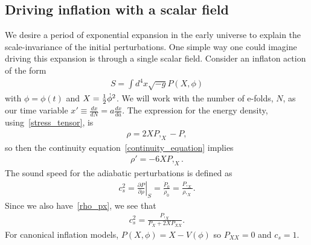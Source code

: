     \subsection{Driving inflation with a scalar field}
    We desire a period of exponential expansion in the early universe to explain the
    scale-invariance of the initial perturbations.
    One simple way one could imagine driving this expansion is through a single
    scalar field.
Consider an inflaton action of the form
\begin{align}
S = \int d^4x \sqrt{-g}P(X,\phi)
\end{align}
with $\phi=\phi(t)$ and $X=\frac{1}{2}\dot{\phi}^2$.
We will work with the number of e-folds, $N$, as our time variable
$x'\equiv\frac{dx}{dN}=a\frac{dx}{da}$.
The expression for the energy density, using~\eqref{stress_tensor}, is
\begin{align}\label{rho_px}
    \rho = 2XP,_X-P,
\end{align}
so then the continuity equation~\eqref{continuity_equation} implies
\begin{align}\label{rho_deriv}
    \rho' = -6XP,_X.
\end{align}
    The sound speed for the adiabatic perturbations is defined as~\cite{Christopherson_2009}
    \begin{align}\label{sound_speed_definition}
        c_s^2 = \left. \frac{\partial P}{\partial \rho} \right|_S = \frac{\dot{P}_0}{\dot{\rho}_0}
        = \frac{P,_X}{\rho,_X}.
    \end{align}
    Since we also have~\eqref{rho_px}, we see that
    \begin{align}
        c_s^2 = \frac{P,_X}{P_X+2X P_{XX}}.
    \end{align}
    For canonical inflation models, $P(X,\phi)=X-V(\phi)$
    so $P_{XX}=0$ and $c_s=1$.



